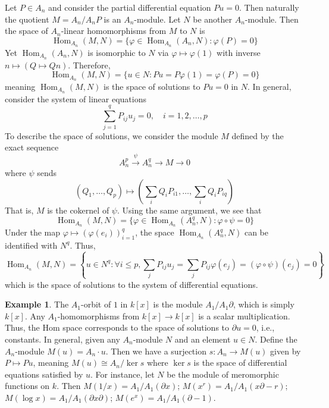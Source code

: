 \documentclass[11pt, a4paper]{article}
\theoremstyle{definition}
\newtheorem{example}[theorem]{Example}
\newcommand{\Hom}[0]{\operatorname{Hom}}
\begin{document}
    Let $P\in A_n$ and consider the partial differential equation $Pu=0$. Then naturally the quotient $M=A_n/A_nP$ is an $A_n$-module. Let $N$ be another $A_n$-module. Then the space of $A_n$-linear homomorphisms from $M$ to $N$ is
    \[\Hom_{A_n}(M, N)=\{\varphi\in \Hom_{A_n}(A_n, N):\varphi(P)=0\}\]
    Yet $\Hom_{A_n}(A_n, N)$ is isomorphic to $N$ via $\varphi\mapsto \varphi(1)$ with inverse $n\mapsto (Q\mapsto Qn)$. Therefore,
    \[\Hom_{A_n}(M, N)=\{u\in N:Pu=P\varphi(1)=\varphi(P)=0\}\]
    meaning $\Hom_{A_n}(M, N)$ is the space of solutions to $Pu=0$ in $N$. In general, consider the system of linear equations 
    \[\sum_{j=1}^q P_{ij}u_j=0, \quad i=1,2,\dots, p\]
    To describe the space of solutions, we consider the module $M$ defined by the exact sequence
    \[A_n^p\xrightarrow{\psi} A_n^q\to M\to 0\]
    where $\psi$ sends
    \[(Q_1,\dots, Q_p)\mapsto \left(\sum_i Q_iP_{i1},\dots,\sum_i Q_iP_{iq}\right)\]
    That is, $M$ is the cokernel of $\psi$. Using the same argument, we see that
    \[\Hom_{A_n}(M, N)=\{\varphi\in\Hom_{A_n}(A_n^q, N):\varphi\circ\psi=0\}\]
    Under the map $\varphi\mapsto(\varphi(e_i))_{i=1}^q$, the space $\Hom_{A_n}(A_n^q, N)$ can be identified with $N^q$. Thus, 
    \[\Hom_{A_n}(M, N)=\left\{u\in N^q:\forall i\leqslant p, \sum_j P_{ij}u_j=\sum_j P_{ij}\varphi(e_j)=(\varphi\circ\psi)(e_j)=0\right\}\]
    which is the space of solutions to the system of differential equations.
    \begin{example}\label{exp-Mf}
        The $A_1$-orbit of $1$ in $k[x]$ is the module $A_1/A_1\partial$, which is simply $k[x]$. Any $A_1$-homomorphisms from $k[x]\to k[x]$ is a scalar multiplication. Thus, the Hom space corresponds to the space of solutions to $\partial u=0$, i.e., constants. In general, given any $A_n$-module $N$ and an element $u\in N$. Define the $A_n$-module $M(u)=A_n\cdot u$. Then we have a surjection $s:A_n\to M(u)$ given by $P\mapsto Pu$, meaning $M(u)\cong A_n/\ker s$ where $\ker s$ is the space of differential equations satisfied by $u$. For instance, let $N$ be the module of meromorphic functions on $k$. Then $M(1/x)=A_1/A_1(\partial x)$; $M(x^r)=A_1/A_1(x\partial-r)$; $M(\log x)=A_1/A_1(\partial x\partial)$; $M(e^x)=A_1/A_1(\partial -1)$.
    \end{example}
\end{document}
